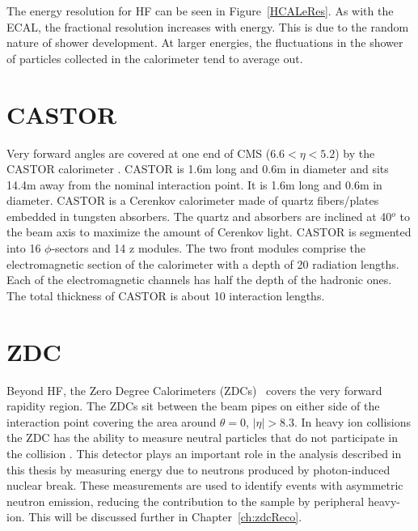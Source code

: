     The energy resolution for HF can be seen in Figure~\ref{HCALeRes}.  
    As with the ECAL, the fractional resolution increases with energy. 
    This is due to the random nature of shower development. 
    At larger energies, the fluctuations in the shower of particles collected 
      in the calorimeter tend to average out.
   
  \section{CASTOR}
   Very forward angles are covered at one end of CMS ($6.6 < \eta < 5.2$) by 
     the CASTOR calorimeter \cite{Andreev:2010zzb}.
   CASTOR is 1.6m long and 0.6m in diameter and sits 14.4m away from the nominal
     interaction point. It is 1.6m long and 0.6m in diameter. 
   CASTOR is a Cerenkov calorimeter made of quartz fibers/plates embedded in 
     tungsten absorbers.
   The quartz and absorbers are inclined at 40$^o$ to the beam axis to maximize
     the amount of Cerenkov light. 
   CASTOR is segmented into 16 $\phi$-sectors and 14 z modules.
   The two front modules comprise the electromagnetic section of the calorimeter
     with a depth of 20 radiation lengths. 
   Each of the electromagnetic channels has half the depth of the hadronic ones. 
   The total thickness  of CASTOR is about 10 interaction lengths. 

  \section{ZDC \label{sec:zdcDet}} 
    Beyond HF, the Zero Degree Calorimeters (ZDCs)~\cite{Grachov:2006ke} covers the very forward 
      rapidity region.
    The ZDCs sit between the beam pipes on either side of the interaction point 
      covering the area around $\theta = 0$, $|\eta| > 8.3$.
    In heavy ion collisions the ZDC has the ability to measure neutral particles 
    	that do not participate in the collision \cite{tCmsE}.
    This detector plays an important role in the analysis described in this
      thesis by measuring energy due to neutrons produced by photon-induced 
      nuclear break.
    These measurements are used to identify events with asymmetric neutron 
      emission, reducing the contribution to the sample by peripheral heavy-ion.
      This will be discussed further in Chapter~\ref{ch:zdcReco}.

